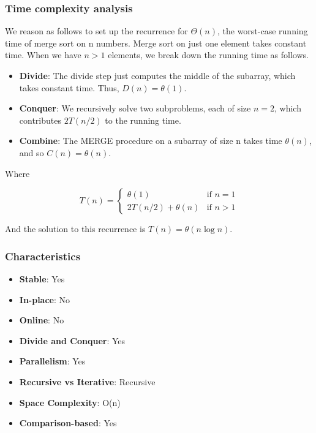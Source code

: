 \subsubsection*{Time complexity analysis}

We reason as follows to set up the recurrence for $\Theta(n)$, the worst-case running
time of merge sort on n numbers. Merge sort on just one element takes constant
time. When we have $n > 1$ elements, we break down the running time as follows.
\begin{itemize}
    \item \textbf{Divide}: The divide step just computes the middle of the subarray, which takes constant time. Thus, $D(n) = \theta(1)$.
    \item \textbf{Conquer}: We recursively solve two subproblems, each of size $n=2$, which contributes $2T(n/2)$ to the running time.
    \item \textbf{Combine}: The MERGE procedure on a subarray of size n takes time $\theta(n)$, and so $C(n) = \theta(n)$.
\end{itemize}

Where 

$$
T(n) = \begin{cases} 
    \theta(1) & \text{if $n = 1$} \\
    2T(n/2) + \theta(n) & \text{if $n > 1$}
\end{cases}
$$

And the solution to this recurrence is $T(n) = \theta(n \log n)$.

\subsubsection*{Characteristics}

\begin{multicols}{2}
    \begin{itemize}
        \item \textbf{Stable}: Yes
        \item \textbf{In-place}: No
        \item \textbf{Online}: No
        \item \textbf{Divide and Conquer}: Yes
        \item \textbf{Parallelism}: Yes
        \item \textbf{Recursive vs Iterative}: Recursive
        \item \textbf{Space Complexity}: O(n)
        \item \textbf{Comparison-based}: Yes
    \end{itemize}
\end{multicols}

